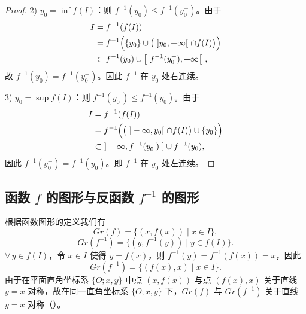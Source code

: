 \begin{proof}
	2) \(y_0=\inf f(I)\)：则 \(f^{-1}(y_0)\le f^{-1}(y_0^+)\)。由于
	\[
	\begin{aligned}
	I&=f^{-1}(f(I))\\
	&=f^{-1}\Bigl(\{y_0\}\cup\bigl(\ ]y_0,+\infty[\ \cap f(I)\bigr)\Bigr)\\
	&\subset f^{-1}(y_0)\cup\bigl[\ f^{-1}(y_0^+),+\infty\bigr[\ ,
	\end{aligned}
	\]
	故 \(f^{-1}(y_0)=f^{-1}(y_0^+)\)。因此 \(f^{-1}\) 在 \(y_0\) 处右连续。

	3) \(y_0=\sup f(I)\)：则 \(f^{-1}(y_0^-)\le f^{-1}(y_0)\)。由于
	\[
	\begin{aligned}
	I&=f^{-1}(f(I))\\
	&=f^{-1}\Bigl(\bigl(\ ]-\infty,y_0[\ \cap f(I)\bigr)\cup\{y_0\}\Bigr)\\
	&\subset\ ]-\infty,f^{-1}(y_0^-)\ ]\cup f^{-1}(y_0),
	\end{aligned}
	\]
	因此 \(f^{-1}(y_0^-)=f^{-1}(y_0)\)。即 \(f^{-1}\) 在 \(y_0\) 处左连续。

\end{proof}

\subsection{\texorpdfstring{函数 \(f\) 的图形与反函数 \(f^{-1}\) 的图形}{函数f的图形与反函数的图形}}

根据函数图形的定义我们有
\[
Gr(f)=\{(x,f(x))\mid x\in I\},
\]
\[
Gr(f^{-1})=\{(y,f^{-1}(y))\mid y\in f(I)\}.
\]
\(\forall\,y\in f(I)\)，令 \(x\in I\) 使得 \(y=f(x)\)，则 \(f^{-1}(y)=f^{-1}(f(x))=x\)，因此
\[
Gr(f^{-1})=\{(f(x),x)\mid x\in I\}.
\]
由于在平面直角坐标系 \(\{O;x,y\}\) 中点 \((x,f(x))\) 与点 \((f(x),x)\) 关于直线 \(y=x\) 对称，故在同一直角坐标系 \(\{O;x,y\}\) 下，\(Gr(f)\) 与 \(Gr(f^{-1})\) 关于直线 \(y=x\) 对称（）。

